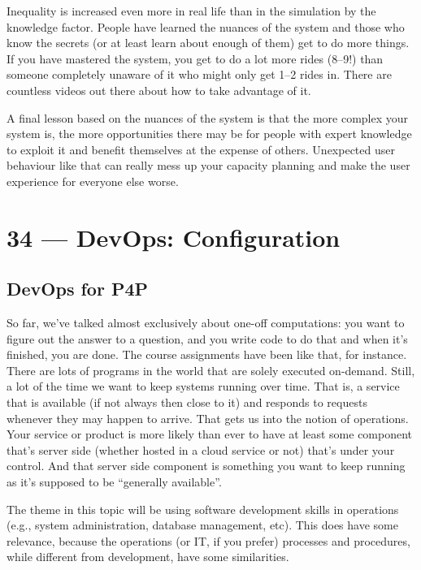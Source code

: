 \documentclass[a4paper]{report}
\begin{document}
Inequality is increased even more in real life than in the simulation by the knowledge factor. People have learned the nuances of the system and those who know the secrets (or at least learn about enough of them) get to do more things. If you have mastered the system, you get to do a lot more rides (8--9!) than someone completely unaware of it who might only get 1--2 rides in. There are countless videos out there about how to take advantage of it.

A final lesson based on the nuances of the system is that the more complex your system is, the more opportunities there may be for people with expert knowledge to exploit it and benefit themselves at the expense of others. Unexpected user behaviour like that can really mess up your capacity planning and make the user experience for everyone else worse. 









\chapter*{34 --- DevOps: Configuration}


\section*{DevOps for P4P}
So far, we've talked almost exclusively about one-off computations:
you want to figure out the answer to a question, and you write code to
do that and when it's finished, you are done. 
The course assignments have been like that, for instance. There are lots
of programs in the world that are solely executed on-demand. Still, a lot
of the time we want to keep systems running over time. That is, a service
that is available (if not always then close to it) and responds to requests
whenever they may happen to arrive. That gets us
into the notion of operations. Your service or product is more likely than 
ever to have at least some component that's server side (whether hosted
in a cloud service or not) that's under your control. And that server side
component is something you want to keep running as it's supposed to be 
``generally available''.

The theme in this topic will be using software development skills in
operations (e.g., system administration, database management, etc). This
does have some relevance, because the operations (or IT, if you prefer)
processes and procedures, while different from development, have some
similarities. 
\end{document}
